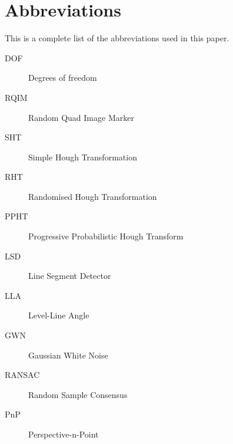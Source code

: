 \chapter*{Abbreviations}
This is a complete list of the abbreviations used in this paper.

\begin{description}
	\item[DOF] Degrees of freedom
	\item[RQIM] Random Quad Image Marker
	\item[SHT] Simple Hough Transformation
	\item[RHT] Randomised Hough Transformation
	\item[PPHT] Progressive Probabilistic Hough Transform
	\item[LSD] Line Segment Detector
	\item[LLA] Level-Line Angle
	\item[GWN] Gaussian White Noise
	\item[RANSAC] Random Sample Consensus
	\item[PnP] Perspective-n-Point
\end{description}